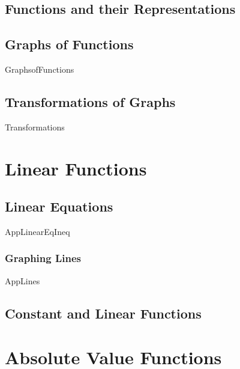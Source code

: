 \section{Functions and their Representations}



\newpage

\section{Graphs of Functions}

{GraphsofFunctions}

\newpage

\section{Transformations of Graphs}

{Transformations}

\newpage

\chapter{Linear Functions}

\section{Linear Equations}

{AppLinearEqIneq}
\newpage

\subsection{Graphing Lines}
{AppLines}

\newpage

\section{Constant and Linear Functions}



\newpage


\chapter{Absolute Value Functions}

